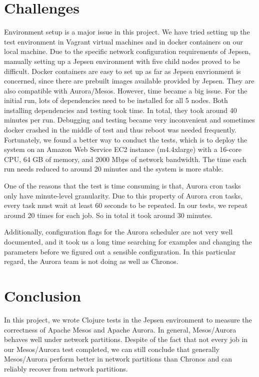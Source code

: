 \documentclass[letterpaper,twocolumn,10pt]{article}
\begin{document}
\section{Challenges}
Environment setup is a major issue in this project. We have tried setting up the test environment in Vagrant virtual machines and in docker containers on our local machine. Due to the specific network configuration requirements of Jepsen, manually setting up a Jepsen environment with five child nodes proved to be difficult. Docker containers are easy to set up as far as Jepsen envrionment is concerned, since there are prebuilt images available provided by Jepsen. They are also compatible with Aurora/Mesos. However, time became a big issue. For the initial run, lots of dependencies need to be installed for all 5 nodes. Both installing dependencies and testing took time. In total, they took around 40 minutes per run. Debugging and testing became very inconvenient and sometimes docker crashed in the middle of test and thus reboot was needed frequently. Fortunately, we found a better way to conduct the tests, which is to deploy the system on an Amazon Web Service EC2 instance (m4.4xlarge) with a 16-core CPU, 64 GB of memory, and 2000 Mbps of network bandwidth. The time each run needs reduced to around 20 minutes and the system is more stable. 

One of the reasons that the test is time consuming is that, Aurora cron tasks only have minute-level granularity. Due to this property of Aurora cron tasks, every task must wait at least 60 seconds to be repeated. In our tests, we repeat around 20 times for each job. So in total it took around 30 minutes. 

Additionally, configuration flags for the Aurora scheduler are not very well documented, and it took us a long time searching for examples and changing the parameters before we figured out a sensible configuration. In this particular regard, the Aurora team is not doing as well as Chronos.

\section{Conclusion}
In this project, we wrote Clojure tests in the Jepsen environment to measure the correctness of Apache Mesos and Apache Aurora. In general, Mesos/Aurora behaves well under network partitions. Despite of the fact that not every job in our Mesos/Aurora test completed, we can still conclude that generally Mesos/Aurora perform better in network partitions than Chronos and can reliably recover from network partitions. 
\end{document}
